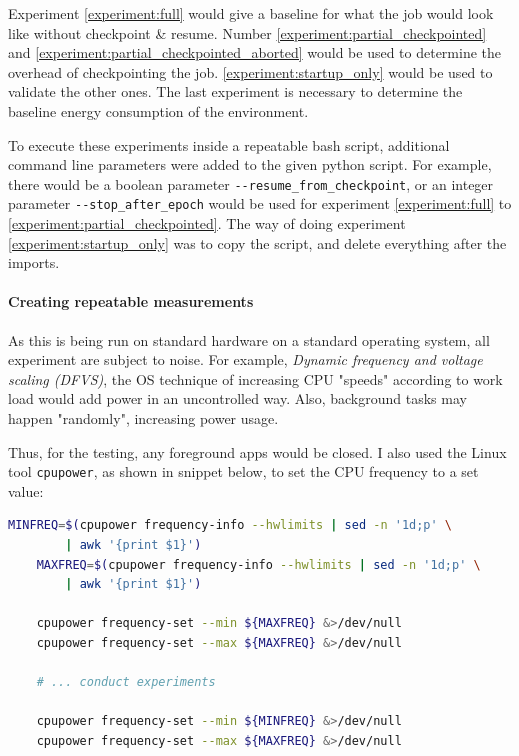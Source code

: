 Experiment \ref{experiment:full} would give a baseline for what the job would look like without checkpoint \& resume. Number \ref{experiment:partial_checkpointed} and \ref{experiment:partial_checkpointed_aborted} would be used to determine the overhead of checkpointing the job. \ref{experiment:startup_only} would be used to validate the other ones. The last experiment is necessary to determine the baseline energy consumption of the environment.

To execute these experiments inside a repeatable bash script, additional command line parameters were added to the given python script. 
For example, there would be a boolean parameter \verb|--resume_from_checkpoint|, or an integer parameter \verb|--stop_after_epoch| would be used for experiment \ref{experiment:full} to \ref{experiment:partial_checkpointed}. 
The way of doing experiment \ref{experiment:startup_only} was to copy the script, and delete everything after the imports.

\paragraph{Creating repeatable measurements}

As this is being run on standard hardware on a standard operating system, all experiment are subject to noise. 
For example, \emph{Dynamic frequency and voltage scaling (DFVS)}, the OS technique of increasing CPU "speeds" according to work load would add power in an uncontrolled way. Also, background tasks may happen "randomly", increasing power usage. 

Thus, for the testing, any foreground apps would be closed. I also used the Linux tool \verb|cpupower|, as shown in snippet below, to set the CPU frequency to a set value:

\begin{lstlisting}[language=bash, frame=single, numbers=none, caption={Used operating system information}, basicstyle=\ttfamily]
    MINFREQ=$(cpupower frequency-info --hwlimits | sed -n '1d;p' \
        | awk '{print $1}')
    MAXFREQ=$(cpupower frequency-info --hwlimits | sed -n '1d;p' \
        | awk '{print $1}')
    
    cpupower frequency-set --min ${MAXFREQ} &>/dev/null
    cpupower frequency-set --max ${MAXFREQ} &>/dev/null

    # ... conduct experiments

    cpupower frequency-set --min ${MINFREQ} &>/dev/null
    cpupower frequency-set --max ${MAXFREQ} &>/dev/null
\end{lstlisting}
\label{listing:setting_cpu_frequency}

